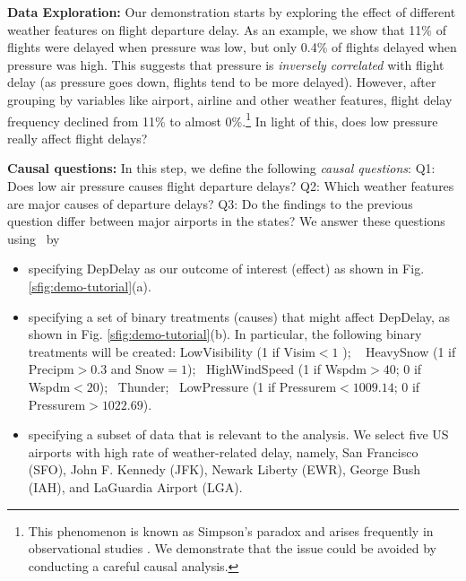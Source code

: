 {\bf Data Exploration:} Our demonstration starts by exploring the effect of different weather features
 on flight departure delay. As an example, we show that 11\% of flights were delayed
when pressure was low, but only 0.4\% of flights delayed
when pressure was high. This suggests that pressure is {\em inversely correlated} with flight delay
(as pressure goes down, flights tend to be more delayed).
However, after grouping by variables like airport, airline and other weather features,
flight delay frequency declined from 11\% to almost 0\%.\footnote{This phenomenon
is known as Simpson's paradox and arises frequently in observational studies \cite{pearl2014comment}.
We demonstrate that the issue could be avoided by conducting a careful causal analysis.
} In light of this, does low pressure really affect flight delays?



 {\bf Causal questions:} In this step, we define the following {\em causal questions}:
Q1: Does low air pressure causes flight departure delays?
Q2: Which weather features are major causes of departure delays?
Q3: Do the findings to the previous question differ between major airports in the states? We answer these questions using \GSQL\ by
 \vspace{-0.24cm}
\begin{itemize}
  \item specifying DepDelay as our outcome of interest (effect)
as shown in Fig. \ref{sfig:demo-tutorial}(a).
 \vspace{-0.33cm} \item specifying a set of binary treatments (causes)
 \newline
 that might affect DepDelay,
 as shown in Fig. \ref{sfig:demo-tutorial}(b).
In particular, the following binary treatments will be created:
LowVisibility (1 if Visim$<1$ ); \
  HeavySnow (1 if Precipm$>0.3$ and Snow$=1$); \
  HighWindSpeed (1 if Wspdm$>40$; 0 if Wspdm$<20$); \
  Thunder; \ LowPressure (1 if Pressurem$<1009.14$; 0 if Pressurem$>1022.69$).

   \item specifying a subset of data that is relevant to the analysis.  We select five US airports  with high rate of weather-related delay, namely,
    San Francisco (SFO), John F. Kennedy (JFK), Newark Liberty (EWR),
    \newline
    George Bush (IAH), and LaGuardia Airport (LGA).
\end{itemize}

